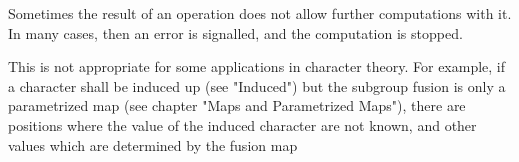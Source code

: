 %

Sometimes  the  result  of  an   operation  does  not  allow   further
computations with it.  In many cases, then an error is signalled,  and
the computation is stopped.

This is not  appropriate  for some applications  in  character theory.
For example,  if a  character shall be induced  up (see "Induced") but
the subgroup fusion is only a parametrized map  (see chapter "Maps and
Parametrized  Maps"), there  are  positions where  the  value  of  the
induced character are not known, and other values which are determined
by the fusion map\:

